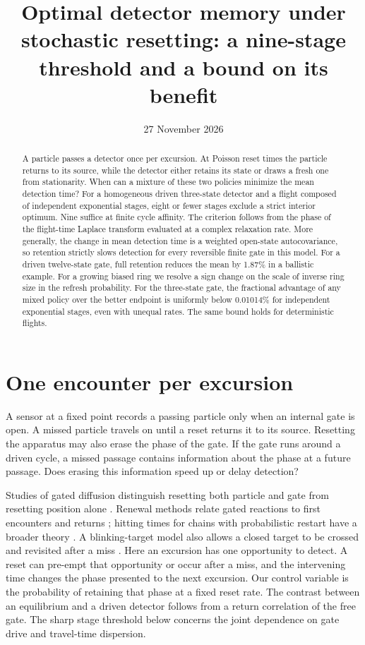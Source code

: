 \documentclass[11pt]{article}
\title{Optimal detector memory under stochastic resetting: a nine-stage threshold and a bound on its benefit}
\author{}
\date{27 November 2026}
\begin{document}
\maketitle
\begin{abstract}
A particle passes a detector once per excursion. At Poisson reset times the particle returns to its source, while the detector either retains its state or draws a fresh one from stationarity. When can a mixture of these two policies minimize the mean detection time? For a homogeneous driven three-state detector and a flight composed of independent exponential stages, eight or fewer stages exclude a strict interior optimum. Nine suffice at finite cycle affinity. The criterion follows from the phase of the flight-time Laplace transform evaluated at a complex relaxation rate. More generally, the change in mean detection time is a weighted open-state autocovariance, so retention strictly slows detection for every reversible finite gate in this model. For a driven twelve-state gate, full retention reduces the mean by 1.87\% in a ballistic example. For a growing biased ring we resolve a sign change on the scale of inverse ring size in the refresh probability. For the three-state gate, the fractional advantage of any mixed policy over the better endpoint is uniformly below 0.01014\% for independent exponential stages, even with unequal rates. The same bound holds for deterministic flights.
\end{abstract}

\section{One encounter per excursion}
A sensor at a fixed point records a passing particle only when an internal gate is open. A missed particle travels on until a reset returns it to its source. Resetting the apparatus may also erase the phase of the gate. If the gate runs around a driven cycle, a missed passage contains information about the phase at a future passage. Does erasing this information speed up or delay detection?

Studies of gated diffusion distinguish resetting both particle and gate from resetting position alone \cite{bress,mercado,biswas}. Renewal methods relate gated reactions to first encounters and returns \cite{scher}; hitting times for chains with probabilistic restart have a broader theory \cite{avra}. A blinking-target model also allows a closed target to be crossed and revisited after a miss \cite{zbik}. Here an excursion has one opportunity to detect. A reset can pre-empt that opportunity or occur after a miss, and the intervening time changes the phase presented to the next excursion. Our control variable is the probability of retaining that phase at a fixed reset rate. The contrast between an equilibrium and a driven detector follows from a return correlation of the free gate. The sharp stage threshold below concerns the joint dependence on gate drive and travel-time dispersion.
\end{document}
